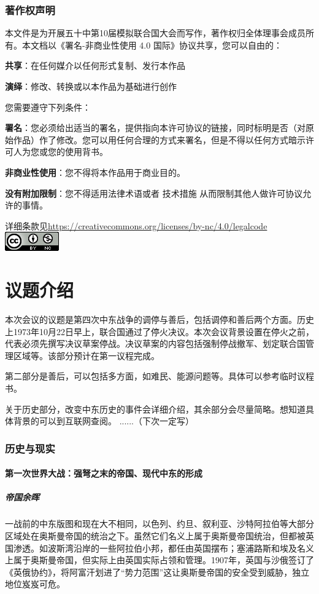 \documentclass{article}
\begin{document}
\section{著作权声明}
本文件是为开展五十中第10届模拟联合国大会而写作，著作权归全体理事会成员所有。本文档以《署名-非商业性使用 4.0 国际》协议共享，您可以自由的：

\large{\textbf{共享}：在任何媒介以任何形式复制、发行本作品}

\large{\textbf{演绎}：修改、转换或以本作品为基础进行创作}

您需要遵守下列条件：

\large{\textbf{署名}：您必须给出适当的署名，提供指向本许可协议的链接，同时标明是否（对原始作品）作了修改。您可以用任何合理的方式来署名，但是不得以任何方式暗示许可人为您或您的使用背书。}

\large{\textbf{非商业性使用}：您不得将本作品用于商业目的。}

\large{\textbf{没有附加限制}：您不得适用法律术语或者 技术措施 从而限制其他人做许可协议允许的事情。}

详细条款见\url{https://creativecommons.org/licenses/by-nc/4.0/legalcode}
\\
\includegraphics{88x31.png}
\clearpage
\part{议题介绍}
本次会议的议题是第四次中东战争的调停与善后，包括调停和善后两个方面。历史上1973年10月22日早上，联合国通过了停火决议。本次会议背景设置在停火之前，代表必须先撰写决议草案停战。决议草案的内容包括强制停战撤军、划定联合国管理区域等。该部分预计在第一议程完成。

第二部分是善后，可以包括多方面，如难民、能源问题等。具体可以参考临时议程书。

关于历史部分，改变中东历史的事件会详细介绍，其余部分会尽量简略。想知道具体背景的可以到互联网查阅。
......（下次一定写）
\section{历史与现实}
\subsection{第一次世界大战：强弩之末的帝国、现代中东的形成}
\subsubsection{帝国余晖}
一战前的中东版图和现在大不相同，以色列、约旦、叙利亚、沙特阿拉伯等大部分区域处在奥斯曼帝国的统治之下。虽然它们名义上属于奥斯曼帝国统治，但都被英国渗透。如波斯湾沿岸的一些阿拉伯小邦，都任由英国摆布；塞浦路斯和埃及名义上属于奥斯曼帝国，但实际上由英国实际占领和管理。1907年，英国与沙俄签订了《英俄协约》，将阿富汗划进了“势力范围”这让奥斯曼帝国的安全受到威胁，独立地位岌岌可危。
\end{document}
